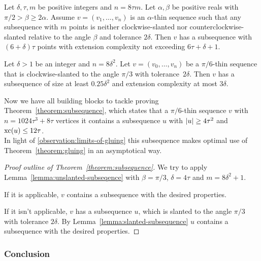 \begin{lemma}\label{lemma:unslanted-subseqence}
  Let $\delta, \tau, m$ be positive integers and $n=8\tau m$. Let $\alpha,\beta$ be positive reals with $\pi/2>\beta\geq 2\alpha$. Assume $v=(v_1,\dots,v_n)$ is an $\alpha$-thin sequence such that any subsequence with $m$ points is neither clockwise-slanted nor counterclockwise-slanted relative to the angle $\beta$ and tolerance $2\delta$. Then $v$ has a subsequence with $(6+\delta)\tau$ points with extension complexity not exceeding $6\tau+\delta+1$.
\end{lemma}

\begin{lemma}\label{lemma:slanted-subsequence}
  Let $\delta>1$ be an integer and $n=8\delta^2$. Let $v=(v_0,\ldots,v_n)$ be a $\pi/6$-thin sequence that is clockwise-slanted to the angle $\pi/3$ with tolerance~$2\delta$. Then $v$ has a subsequence of size at least $0.25\delta^2$ and extension complexity at most $3\delta$.
\end{lemma}

Now we have all building blocks to tackle proving Theorem~\ref{theorem:subsequence}, which states that a $\pi/6$-thin sequence $v$ with $n = 1024\tau^3 + 8\tau$ vertices it contains a subsequence $u$ with $\lvert u\rvert \geq 4\tau^2$ and $\operatorname{xc}(u) \leq 12\tau$.\\
In light of \ref{observation:limits-of-gluing} this subsequence makes optimal use of Theorem~\ref{theorem:gluing} in an asymptotical way.

\begin{proof}[Proof outline of Theorem~\ref{theorem:subsequence}]
  We try to apply Lemma~\ref{lemma:unslanted-subseqence} with $\beta = \pi/3$, $\delta = 4\tau$ and $m = 8\delta^2 + 1$.

  If it is applicable, $v$ contains a subsequence with the desired properties.

  If it isn't applicable, $v$ has a subsequence $u$, which is slanted to the angle $\pi/3$ with tolerance $2\delta$. By Lemma~\ref{lemma:slanted-subsequence} $u$ contains a subsequence with the desired properties.
\end{proof}



\subsubsection{Conclusion}

